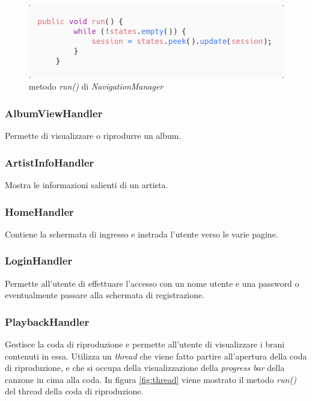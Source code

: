 \documentclass{article}
\begin{document}
  \begin{figure}[H]
    \centering
    \includegraphics[width=0.8\linewidth]{run.png}
    \caption{metodo \textit{run()} di \textit{NavigationManager}}
    \label{fig:run}
  \end{figure}

  \subsubsection{AlbumViewHandler}
  Permette di visualizzare o riprodurre un album.
  \subsubsection{ArtistInfoHandler}
  Mostra le informazioni salienti di un artista.
  \subsubsection{HomeHandler}
  Contiene la schermata di ingresso e instrada l'utente verso le varie pagine.
  \subsubsection{LoginHandler}
  Permette all'utente di effettuare l'accesso con un nome utente e una password o
  eventualmente passare alla schermata di registrazione.

  \subsubsection{PlaybackHandler}
  Gestisce la coda di riproduzione e permette all'utente di visualizzare i brani contenuti in essa. Utilizza un \textit{thread} che viene fatto partire all'apertura della coda di riproduzione, e che si occupa della visualizzazione della \textit{progress bar} della canzone in cima alla coda.
  In figura \ref{fig:thread} viene mostrato il metodo \textit{run()} del thread della coda di riproduzione.
\end{document}
